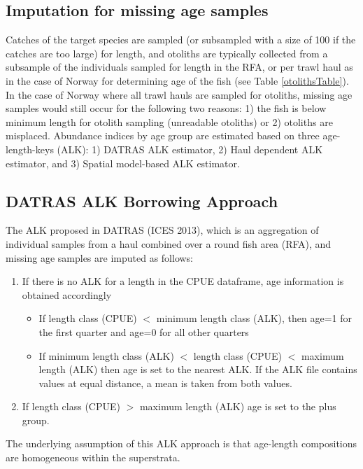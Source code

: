 \documentclass[a4paper 12pt]{article}
\numberwithin{equation}{section}
\begin{document}
\begin{appendices}
\section{\large Imputation for missing age samples}
\label{sec:imputationappendix}
Catches of the target species are sampled (or subsampled with a size of 100 if the catches are too large) for length, and otoliths are typically collected from a subsample of the individuals sampled for length in the RFA,  or per trawl haul as in the case of Norway for determining age of the fish (see Table \ref{otolithsTable}). In the case of Norway where all trawl hauls are sampled for otoliths, missing age samples would still occur for the following two reasons: 1) the fish is below minimum length for otolith sampling (unreadable otoliths) or 2) otoliths are misplaced. Abundance indices by age group are estimated based on three age-length-keys (ALK): 1) DATRAS ALK estimator, 2) Haul dependent ALK estimator, and 3) Spatial model-based ALK estimator.
\subsection{\normalsize DATRAS ALK Borrowing Approach}
\label{secAp:DATRASBorrow}
The ALK proposed in DATRAS (ICES 2013), which is an aggregation of individual samples from a haul combined over a round fish area (RFA), and missing age samples are imputed as follows: 
\begin{enumerate}
\item If there is no ALK for a length in the CPUE dataframe, age information is obtained accordingly
\begin{itemize}
\item If length class (CPUE) $<$ minimum length class (ALK), then age=1 for the first quarter and age=0 for all other quarters
\item  If minimum length class (ALK) $<$ length class (CPUE) $<$ maximum length (ALK) then age is set to the nearest ALK. If the ALK file contains values at equal distance, a mean is taken from both values. 
\end{itemize}
\item If length class (CPUE) $>$ maximum length (ALK) age is set to the plus group.
\end{enumerate}
The underlying assumption of this ALK approach is that age-length compositions are homogeneous within the superstrata. 

\end{appendices}
\end{document}
